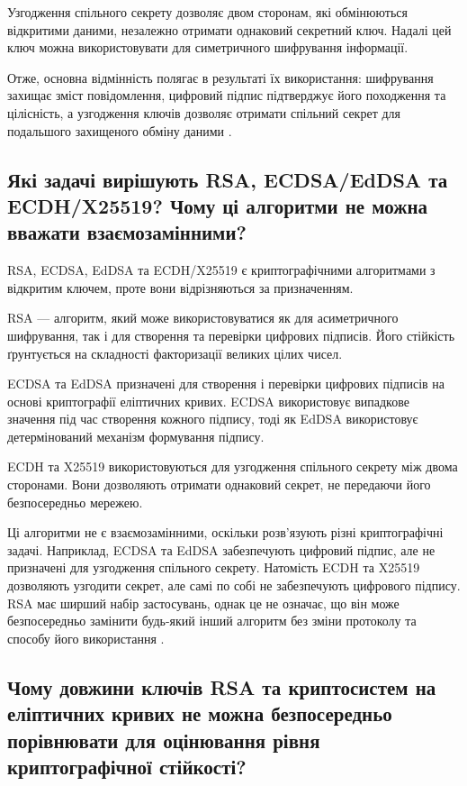 Узгодження спільного секрету дозволяє двом сторонам, які обмінюються відкритими даними, 
незалежно отримати однаковий секретний ключ. Надалі цей ключ можна використовувати для симетричного шифрування інформації.

Отже, основна відмінність полягає в результаті їх використання: шифрування захищає зміст повідомлення, 
цифровий підпис підтверджує його походження та цілісність, а узгодження ключів дозволяє отримати спільний 
секрет для подальшого захищеного обміну даними \cite{RFC8017,RFC7748}.


\subsection{Які задачі вирішують RSA, ECDSA/EdDSA та ECDH/X25519? Чому ці алгоритми не можна вважати взаємозамінними?}

RSA, ECDSA, EdDSA та ECDH/X25519 є криптографічними алгоритмами з відкритим ключем, проте вони відрізняються за призначенням.

RSA — алгоритм, який може використовуватися як для асиметричного шифрування, так і для створення та перевірки цифрових підписів. 
Його стійкість ґрунтується на складності факторизації великих цілих чисел.

ECDSA та EdDSA призначені для створення і перевірки цифрових підписів на основі криптографії еліптичних кривих. 
ECDSA використовує випадкове значення під час створення кожного підпису, тоді як EdDSA
використовує детермінований механізм формування підпису.

ECDH та X25519 використовуються для узгодження спільного секрету між двома сторонами. Вони дозволяють отримати однаковий секрет, 
не передаючи його безпосередньо мережею.

Ці алгоритми не є взаємозамінними, оскільки розв'язують різні криптографічні задачі. Наприклад, ECDSA та EdDSA забезпечують цифровий підпис, 
але не призначені для узгодження спільного секрету. Натомість ECDH та X25519 дозволяють узгодити секрет, але самі по собі не забезпечують цифрового підпису. 
RSA має ширший набір застосувань, однак це не означає, що він може безпосередньо замінити будь-який інший алгоритм без зміни протоколу та способу його використання \cite{RFC8017,RFC8032,RFC7748}.


\subsection{Чому довжини ключів RSA та криптосистем на еліптичних кривих не можна безпосередньо порівнювати для оцінювання рівня криптографічної стійкості?}

